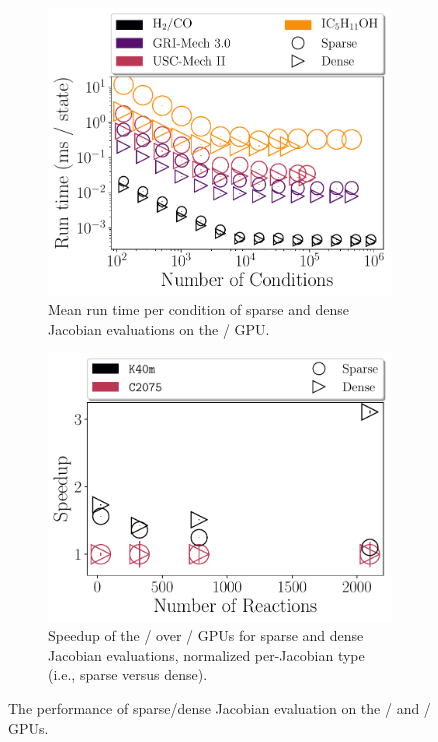 \documentclass[12pt,number,sort&compress,preprint]{elsarticle}
\begin{document}
\begin{figure}[htbp]
   \centering
  \begin{subfigure}[t]{0.48\linewidth}
      \includegraphics[width=\textwidth]{gpu_sparse_vs_dense.pdf}
      \caption{Mean run time per condition of sparse and dense Jacobian evaluations on the \gpunew/ GPU.}
      \label{F:gpu_sparse_vs_dense}
  \end{subfigure}
  \hfill
  \begin{subfigure}[t]{0.48\linewidth}
      \includegraphics[width=\textwidth]{gpu_jacobian_speedup.pdf}
      \caption{Speedup of the \gpunew/ over \gpuold/ GPUs for sparse and dense Jacobian evaluations, normalized per-Jacobian type (i.e., sparse versus dense).}
      \label{F:gpu_jacobian_speedup}
  \end{subfigure}
  \caption{The performance of sparse\slash dense Jacobian evaluation on the \gpunew/ and \gpuold/ GPUs.}
\end{figure}
\end{document}
